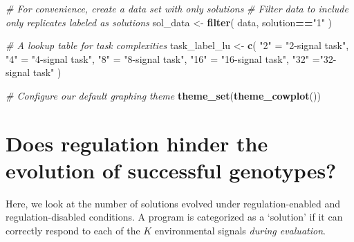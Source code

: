 \documentclass[]{book}
\newenvironment{Shaded}{\begin{snugshade}}{\end{snugshade}}
\newcommand{\CommentTok}[1]{\textcolor[rgb]{0.56,0.35,0.01}{\textit{#1}}}
\newcommand{\KeywordTok}[1]{\textcolor[rgb]{0.13,0.29,0.53}{\textbf{#1}}}
\newcommand{\NormalTok}[1]{#1}
\newcommand{\OperatorTok}[1]{\textcolor[rgb]{0.81,0.36,0.00}{\textbf{#1}}}
\newcommand{\StringTok}[1]{\textcolor[rgb]{0.31,0.60,0.02}{#1}}
\begin{document}
\begin{Shaded}
\begin{Highlighting}[]
\CommentTok{# For convenience, create a data set with only solutions}
\CommentTok{# Filter data to include only replicates labeled as solutions}
\NormalTok{sol_data <-}\StringTok{ }\KeywordTok{filter}\NormalTok{(}
\NormalTok{  data,}
\NormalTok{  solution}\OperatorTok{==}\StringTok{"1"}
\NormalTok{)}

\CommentTok{# A lookup table for task complexities}
\NormalTok{task_label_lu <-}\StringTok{ }\KeywordTok{c}\NormalTok{(}
  \StringTok{"2"}\NormalTok{ =}\StringTok{ "2-signal task"}\NormalTok{,}
  \StringTok{"4"}\NormalTok{ =}\StringTok{ "4-signal task"}\NormalTok{,}
  \StringTok{"8"}\NormalTok{ =}\StringTok{ "8-signal task"}\NormalTok{,}
  \StringTok{"16"}\NormalTok{ =}\StringTok{ "16-signal task"}\NormalTok{,}
  \StringTok{"32"}\NormalTok{ =}\StringTok{"32-signal task"}
\NormalTok{)}

\CommentTok{# Configure our default graphing theme}
\KeywordTok{theme_set}\NormalTok{(}\KeywordTok{theme_cowplot}\NormalTok{())}
\end{Highlighting}
\end{Shaded}

\hypertarget{does-regulation-hinder-the-evolution-of-successful-genotypes}{%
\section{Does regulation hinder the evolution of successful genotypes?}\label{does-regulation-hinder-the-evolution-of-successful-genotypes}}

Here, we look at the number of solutions evolved under regulation-enabled and regulation-disabled conditions.
A program is categorized as a `solution' if it can correctly respond to each of the \(K\) environmental signals \emph{during evaluation}.
\end{document}
